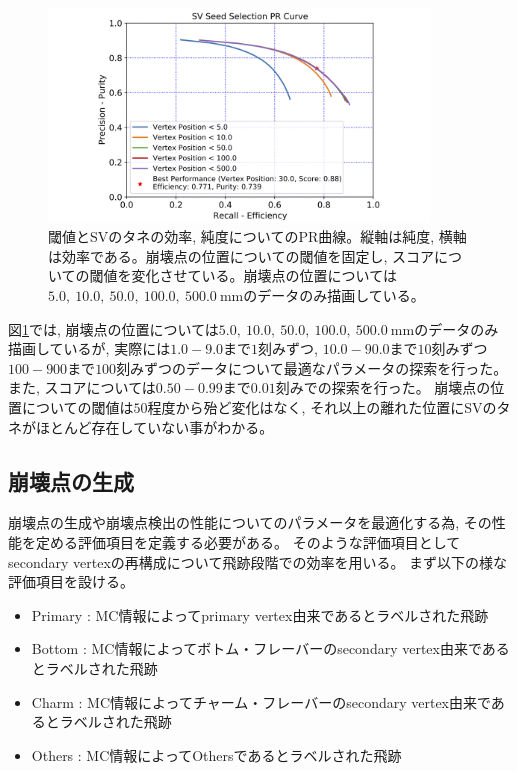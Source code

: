\begin{figure}[htbp]
 \centering
 \includegraphics[width=0.9\textwidth, clip]{Figure/4VertexFinderwithDL/4-2-1-2PRCurve.png}
 \caption[閾値とSVのタネの効率, 純度についてのPR曲線]{閾値とSVのタネの効率, 純度についてのPR曲線。縦軸は純度, 横軸は効率である。崩壊点の位置についての閾値を固定し, スコアについての閾値を変化させている。崩壊点の位置については$5.0,\ 10.0,\ 50.0,\ 100.0,\ 500.0\ {\mathrm{mm}}$のデータのみ描画している。}
 \label{4-2-1-2PRCurve}
\end{figure}

図\ref{4-2-1-2PRCurve}では, 崩壊点の位置については$5.0,\ 10.0,\ 50.0,\ 100.0,\ 500.0\ {\mathrm{mm}}$のデータのみ描画しているが, 実際には$1.0-9.0$まで$1$刻みずつ, $10.0-90.0$まで$10$刻みずつ$100-900$まで$100$刻みずつのデータについて最適なパラメータの探索を行った。
また, スコアについては$0.50-0.99$まで$0.01$刻みでの探索を行った。
崩壊点の位置についての閾値は$50$程度から殆ど変化はなく, それ以上の離れた位置にSVのタネがほとんど存在していない事がわかる。

\subsection{崩壊点の生成} \label{VFDL:TPVFDL:VertexProduction}

崩壊点の生成や崩壊点検出の性能についてのパラメータを最適化する為, その性能を定める評価項目を定義する必要がある。
そのような評価項目としてsecondary vertexの再構成について飛跡段階での効率を用いる。
まず以下の様な評価項目を設ける。

\begin{itemize}
 \item Primary : MC情報によってprimary vertex由来であるとラベルされた飛跡
 \item Bottom : MC情報によってボトム・フレーバーのsecondary vertex由来であるとラベルされた飛跡
 \item Charm : MC情報によってチャーム・フレーバーのsecondary vertex由来であるとラベルされた飛跡
  \item Others : MC情報によってOthersであるとラベルされた飛跡
\end{itemize}

